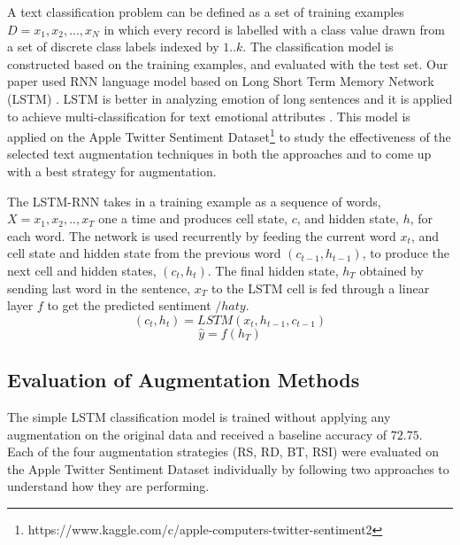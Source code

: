 \documentclass{article}
\begin{document}
A text classification problem can be defined as a set of training examples $D = { x_1, x_2, . . ., x_N}$ in which every record is labelled with a class value drawn from a set of discrete class labels indexed by ${1..k}$\cite{aggarwal2012survey}. The classification model is constructed based on the training examples, and evaluated with the test set. Our paper used RNN language model based on Long Short Term Memory Network (LSTM) \cite{can2018multilingual}. LSTM is better in analyzing emotion of long sentences and it is applied to achieve multi-classification for text emotional attributes \cite{li2016text}. This model is applied on  the Apple Twitter Sentiment Dataset\footnote{https://www.kaggle.com/c/apple-computers-twitter-sentiment2} to study the effectiveness of the selected text augmentation techniques in both the approaches and to come up with a best strategy for augmentation.

The LSTM-RNN takes in a training example as a sequence of words, $X = {x_1, x_2, .., x_T}$ one a time and produces cell state, $c$, and hidden state, $h$, for each word. The network is used recurrently by feeding the current word $x_t$, and cell state and hidden state from the previous word $(c_{t-1}, h_{t-1})$, to produce the next cell and hidden states, $(c_t, h_t)$. The final hidden state, $h_T$ obtained by sending last word in the sentence, $x_T$ to the LSTM cell is fed through a linear layer $f$ to get the predicted sentiment $/hat{y}$.
\begin{equation}
(c_t, h_t) = LSTM (x_t, h_{t-1}, c_{t-1}) 
\end{equation}
\begin{equation}
\hat{y} = f(h_T)
\end{equation}

\subsection{Evaluation of Augmentation Methods}
The simple LSTM classification model is trained without applying any augmentation on the original data and received a baseline accuracy of $72.75$. Each of the four augmentation strategies (RS, RD, BT, RSI) were evaluated on the Apple Twitter Sentiment Dataset individually by following two approaches to understand how they are performing. 
\end{document}
